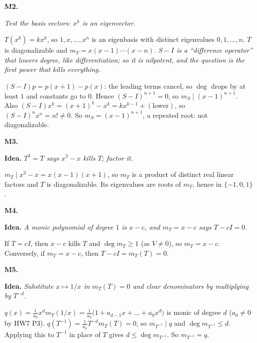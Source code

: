 \documentclass[10pt]{scrartcl}
\newcommand{\idea}[1]{{\color{OliveGreen!75!black}\textbf{Idea.}} \textit{#1}\par}
\newenvironment{prob}{\par\medskip\noindent\begin{minipage}{\linewidth}\setlength{\parskip}{3pt}}{\end{minipage}\par}
\begin{document}
\begin{prob}
\textbf{M2. }\par 
\begin{enumerate}[(a)]
  \ii \idea{Test the basis vectors: $x^k$ is an eigenvector.}
  $T(x^k)=kx^k$, so $1,x,\dots,x^n$ is an eigenbasis with distinct eigenvalues $0,1,\dots,n$. $T$ is diagonalizable and $m_T=x(x-1)\cdots(x-n)$.
  \ii \idea{$S-I$ is a ``difference operator'' that lowers degree, like differentiation; so it is nilpotent, and the question is the first power that kills everything.}
  $(S-I)p=p(x+1)-p(x)$: the leading terms cancel, so $\deg$ drops by at least $1$ and constants go to $0$. Hence $(S-I)^{n+1}=0$, so $m_S\mid(x-1)^{n+1}$. Also $(S-I)x^k=(x+1)^k-x^k=kx^{k-1}+(\text{lower})$, so $(S-I)^nx^n=n!\ne0$. So $m_S=(x-1)^{n+1}$, a repeated root: not diagonalizable.
\end{enumerate}
\end{prob}

\begin{prob}
\textbf{M3. }\par 
\idea{$T^3=T$ says $x^3-x$ kills $T$; factor it.}
$m_T\mid x^3-x=x(x-1)(x+1)$, so $m_T$ is a product of distinct real linear factors and $T$ is diagonalizable. Its eigenvalues are roots of $m_T$, hence in $\{-1,0,1\}$.
\end{prob}

\begin{prob}
\textbf{M4. }\par 
\idea{A monic polynomial of degree $1$ is $x-c$, and $m_T=x-c$ says $T-cI=0$.}
If $T=cI$, then $x-c$ kills $T$ and $\deg m_T\ge1$ (as $V\ne0$), so $m_T=x-c$. Conversely, if $m_T=x-c$, then $T-cI=m_T(T)=0$.
\end{prob}

\begin{prob}
\textbf{M5. }\par 
\idea{Substitute $x\mapsto1/x$ in $m_T(T)=0$ and clear denominators by multiplying by $T^{-d}$.}
$q(x)=\frac1{a_0}x^dm_T(1/x)=\frac1{a_0}\big(1+a_{d-1}x+\dots+a_0x^d\big)$ is monic of degree $d$ ($a_0\ne0$ by HW7 P3). $q(T^{-1})=\frac1{a_0}T^{-d}m_T(T)=0$, so $m_{T^{-1}}\mid q$ and $\deg m_{T^{-1}}\le d$. Applying this to $T^{-1}$ in place of $T$ gives $d\le\deg m_{T^{-1}}$. So $m_{T^{-1}}=q$.
\end{prob}
\end{document}
